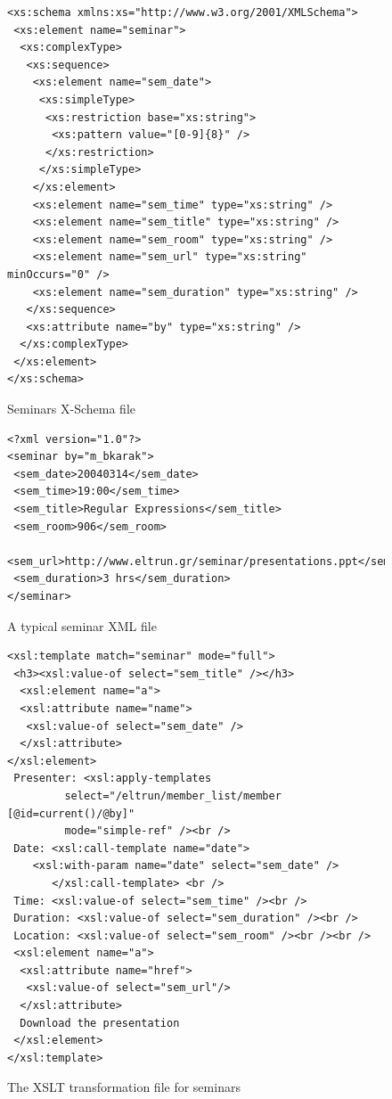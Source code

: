 \documentclass[10pt]{article}
\begin{document}
\begin{figure}
\lstset{language=MYLANG,basicstyle=\ttfamily}
{\begin{lstlisting}
<xs:schema xmlns:xs="http://www.w3.org/2001/XMLSchema">
 <xs:element name="seminar">
  <xs:complexType>
   <xs:sequence>
    <xs:element name="sem_date">
     <xs:simpleType>
      <xs:restriction base="xs:string">
       <xs:pattern value="[0-9]{8}" />
      </xs:restriction>
     </xs:simpleType>
    </xs:element>
    <xs:element name="sem_time" type="xs:string" />
    <xs:element name="sem_title" type="xs:string" />
    <xs:element name="sem_room" type="xs:string" />
    <xs:element name="sem_url" type="xs:string" minOccurs="0" />
    <xs:element name="sem_duration" type="xs:string" />
   </xs:sequence>
   <xs:attribute name="by" type="xs:string" />
  </xs:complexType>
 </xs:element>
</xs:schema>
\end{lstlisting}}
\caption{Seminars X-Schema file}
\label{fig:project-dtd}
\end{figure}

\begin{figure}
\lstset{language=MYLANG,basicstyle=\ttfamily}
{\begin{lstlisting}
<?xml version="1.0"?>
<seminar by="m_bkarak">
 <sem_date>20040314</sem_date>
 <sem_time>19:00</sem_time>
 <sem_title>Regular Expressions</sem_title>
 <sem_room>906</sem_room>
 <sem_url>http://www.eltrun.gr/seminar/presentations.ppt</sem_url>
 <sem_duration>3 hrs</sem_duration>
</seminar>
\end{lstlisting}}
\caption{A typical seminar XML file}
\label{fig:project-xml}
\end{figure}

\begin{figure}
\lstset{language=MYLANG,basicstyle=\ttfamily}
{\begin{lstlisting}
<xsl:template match="seminar" mode="full">
 <h3><xsl:value-of select="sem_title" /></h3>
  <xsl:element name="a">
  <xsl:attribute name="name">
   <xsl:value-of select="sem_date" />
  </xsl:attribute>
</xsl:element>
 Presenter: <xsl:apply-templates 
 	     select="/eltrun/member_list/member [@id=current()/@by]" 
	     mode="simple-ref" /><br />
 Date: <xsl:call-template name="date">
	<xsl:with-param name="date" select="sem_date" />
       </xsl:call-template> <br />
 Time: <xsl:value-of select="sem_time" /><br />
 Duration: <xsl:value-of select="sem_duration" /><br />
 Location: <xsl:value-of select="sem_room" /><br /><br />
 <xsl:element name="a">
  <xsl:attribute name="href">
   <xsl:value-of select="sem_url"/>
  </xsl:attribute>
  Download the presentation
 </xsl:element>
</xsl:template>
\end{lstlisting}}
\caption{The XSLT transformation file for seminars}
\label{fig:project-xslt}
\end{figure}
\end{document}
